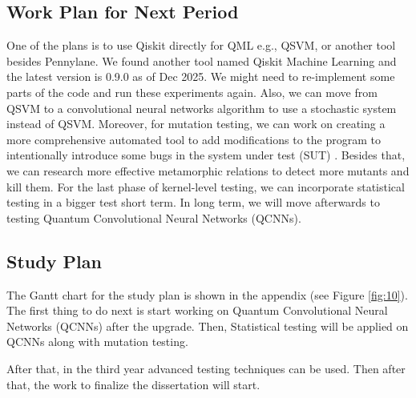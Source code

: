 \documentclass[12pt,a4paper]{article}
\begin{document}
	\subsection{Work Plan for Next Period}
	\label{sec:next-plan}
	
	One of the plans is to use Qiskit directly for QML e.g., QSVM, or another tool besides Pennylane. We found another tool named Qiskit Machine Learning and the latest version is 0.9.0 as of Dec 2025. We might need to re-implement some parts of the code and run these experiments again. Also, we can move from QSVM to a convolutional neural networks algorithm to use a stochastic system instead of QSVM. Moreover, for mutation testing, we can work on creating a more comprehensive automated tool to add modifications to the program to intentionally introduce some bugs in the system under test (SUT) \cite{qMutphyFortunato}. Besides that, we can research more effective metamorphic relations to detect more mutants and kill them. For the last phase of kernel-level testing, we can incorporate statistical testing in a bigger test short term. In long term, we will move afterwards to testing Quantum Convolutional Neural Networks (QCNNs). 
	
	\subsection{Study Plan}
	
	The Gantt chart for the study plan is shown in the appendix (see Figure \ref{fig:10}). The first thing to do next is start working on Quantum Convolutional Neural Networks (QCNNs) after the upgrade. Then, Statistical testing will be applied on QCNNs along with mutation testing. 
	
	After that, in the third year advanced testing techniques can be used. Then after that, the work to finalize the dissertation will start.
	

	

	
\end{document}
